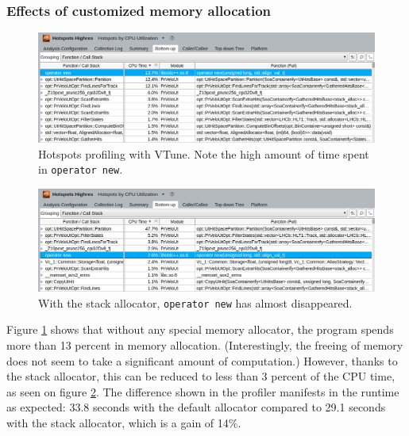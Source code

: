 \documentclass[12pt]{article}
\newcommand{\code}[1]{\texttt{#1}}
\begin{document}
\subsubsection{Effects of customized memory allocation}


\begin{figure}[H]
	\begin{center}
		\includegraphics[width=\textwidth]{velout_without_alloc}
	\end{center}
	\caption[CPU hotspots \textit{without} custom allocator]{Hotspots profiling with VTune. Note the high amount of time spent in \code{operator new}.}
	\label{fig_velout_without_alloc}
\end{figure}


\begin{figure}[H]
	\begin{center}
		\includegraphics[width=\textwidth]{velout_with_alloc}
	\end{center}
	\caption[CPU hotspots \textit{with} custom allocator]{With the stack allocator, \code{operator new} has almost disappeared.}
	\label{fig_velout_with_alloc}
\end{figure}

Figure \ref{fig_velout_without_alloc} shows that without any special memory allocator, the program spends more than 13 percent in memory allocation. (Interestingly, the freeing of memory does not seem to take a significant amount of computation.) However, thanks to the stack allocator, this can be reduced to less than 3 percent of the CPU time, as seen on figure \ref{fig_velout_with_alloc}. The difference shown in the profiler manifests in the runtime as expected: 33.8 seconds with the default allocator compared to 29.1 seconds with the stack allocator, which is a gain of 14\%.
\end{document}
